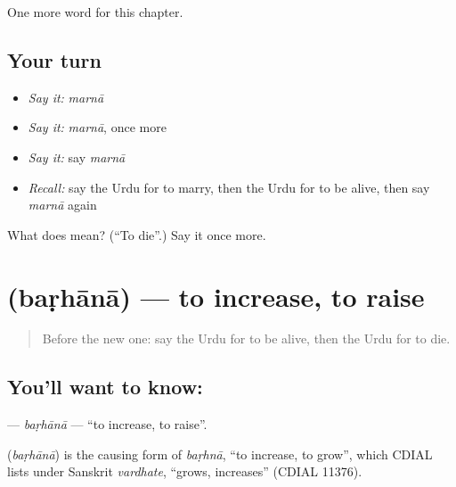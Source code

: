 \begin{grammarlens}[title={What you've built}]
One more word for this chapter.
\end{grammarlens}

\subsection*{Your turn}
\begin{itemize}
\raggedright
  \item \emph{Say it:} \emph{marnā}
  \item \emph{Say it:} \emph{marnā}, once more
  \item \emph{Say it:} say \emph{marnā}
  \item \emph{Recall:} say the Urdu for to marry, then the Urdu for to be alive, then say \emph{marnā} again
\end{itemize}

\begin{tcolorbox}[breakable,colback=teal!4,colframe=teal!35!black,title={Before you move on}]
What does  mean? (\textquotedblleft{}To die\textquotedblright{}.) Say it once more.
\end{tcolorbox}
\section[\texorpdfstring{\ur{بڑھانا} (baṛhānā)}{بڑھانا (baṛhānā)}]{ (baṛhānā) — to increase, to raise}

\label{lesson:UR-C183-barhana}



\begin{quote}
Before the new one: say the Urdu for to be alive, then the Urdu for to die.
\end{quote}

\subsection*{You'll want to know: }
\textbf{} — \emph{baṛhānā} — \textquotedblleft{}to increase, to raise\textquotedblright{}.

\begin{cousinweb}
\textbf{} (\emph{baṛhānā}) is the causing form of \emph{baṛhnā}, \textquotedblleft{}to increase, to grow\textquotedblright{}, which CDIAL lists under Sanskrit \emph{vardhate}, \textquotedblleft{}grows, increases\textquotedblright{} (CDIAL 11376).
\end{cousinweb}

